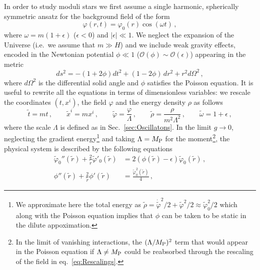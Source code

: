 \documentclass[11pt,a4paper]{article}
\begin{document}
In order to study moduli stars we first assume a single harmonic, spherically symmetric ansatz for the background field of the form
\begin{equation}
\label{eq:StarAnsatz}
\varphi(r,t) = \varphi_0(r) \cos\left(\omega t\right) \,,
\end{equation}
where $\omega = m\left(1+\epsilon\right)$ ($\epsilon < 0$) and $|\epsilon| \ll 1$. We neglect the expansion of the Universe (i.e.~we assume that $m \gg H$) and we include weak gravity effects, encoded in the Newtonian potential $\phi \ll 1$ ($\mathcal{O}\left(\phi\right) \sim \mathcal{O}\left(\epsilon\right)$) appearing in the metric
\begin{equation}
\label{eq:LineElement}
ds^2 = - (1+2 \phi) dt^2 + (1-2\phi) \, dr^2 + r^2 d\Omega^2 \,,
\end{equation}
where $d\Omega^2$ is the differential solid angle and $\phi$ satisfies the Poisson equation. It is useful to rewrite all the equations in terms of dimensionless variables: we rescale the coordinates $(t,x^i)$, the field $\varphi$ and the energy density $\rho$ as follows
\begin{equation}
\label{eq:Rescalings}
\tilde{t} = m t \,, \qquad \tilde{x}^i = m x^i \,, \qquad \tilde{\varphi} = \frac{\varphi}{\Lambda} \,, \qquad \tilde\rho = \frac{\rho}{m^2 \Lambda^2} \,, \qquad \tilde\omega = 1 + \epsilon \,,
\end{equation}
where the scale $\Lambda$ is defined as in Sec.~\ref{sec:Oscillatons}. In the limit $g \rightarrow 0$, neglecting the gradient energy\footnote{We approximate here the total energy as $\tilde\rho = \dot{\tilde{\varphi}}^2/2 + \tilde{\varphi}^2/2 \approx \tilde\varphi_0^2/2$ which along with the Poisson equation implies that $\phi$ can be taken to be static in the dilute appoximation.} and taking $\Lambda = M_{\rm P}$ for the moment\footnote{In the limit of vanishing interactions, the $(\Lambda/M_{\rm P})^2$ term that would appear in the Poisson equation if $\Lambda \neq M_{\rm P}$ could be reabsorbed through the rescaling of the field in eq.~\eqref{eq:Rescalings}.}, the physical system is described by the following equations
\begin{align}
\label{eq:SPField}
\tilde{\varphi}_0''(\tilde{r}) + \frac{2}{\tilde{r}} \tilde{\varphi}'_0(\tilde{r}) & = 2 \left(\phi(\tilde{r}) - \epsilon\right) \tilde{\varphi}_0(\tilde{r}) \,, \\
\phi''(\tilde{r}) + \frac{2}{\tilde{r}} \phi'(\tilde{r}) & = \frac{\tilde{\varphi}_0^2(\tilde{r})}{4}\,,
\label{eq:SPPoisson}
\end{align}
\end{document}
